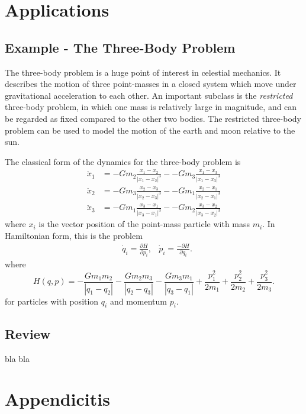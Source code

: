 \documentclass{report}
\theoremstyle{exampstyle} \newtheorem{example}[theorem]{Example}
\theoremstyle{exampstyle} \newtheorem{remark}[theorem]{Remark}
\theoremstyle{exampstyle} \newtheorem{definition}[theorem]{Definition}
\theoremstyle{exampstyle} \newtheorem{lemma}[theorem]{Lemma}
\theoremstyle{exampstyle} \newtheorem{proposition}[theorem]{Proposition}
\begin{document}
\section{Applications}

\subsection{Example - The Three-Body Problem}

The three-body problem \cite{musielak2014three} is a huge point of interest in celestial mechanics.
It describes the motion of three point-masses in a closed system which move under gravitational acceleration to each other.
An important subclass is the \textit{restricted} three-body problem, in which one mass is relatively large in magnitude, and can be regarded as fixed compared to the other two bodies.
The restricted three-body problem can be used to model the motion of the earth and moon relative to the sun.

The classical form of the dynamics for the three-body problem is
\begin{equation*}
	\begin{aligned}
		\ddot{x}_1 &= -G m_2 \frac{x_1 - x_2}{|x_1 - x_2|^3} - -G m_3 \frac{x_1 - x_3}{|x_1 - x_3|^3} \\
		\ddot{x}_2 &= -G m_3 \frac{x_2 - x_3}{|x_2 - x_3|^3} - -G m_1 \frac{x_2 - x_1}{|x_2 - x_1|^3} \\
		\ddot{x}_3 &= -G m_1 \frac{x_3 - x_1}{|x_3 - x_1|^3} - -G m_2 \frac{x_3 - x_2}{|x_3 - x_2|^3}
	\end{aligned}
\end{equation*} 
where $x_i$ is the vector position of the point-mass particle with mass $m_i$.
In Hamiltonian form, this is the problem
\begin{align*}
	&\dot{q}_i = \frac{\partial H}{\partial p_i}, &\dot{p}_i = \frac{- \partial H}{\partial q_i}.
\end{align*}
where
\begin{equation*}
	H(q,p) = - \frac{G m_1 m_2}{|q_1 - q_2|} - \frac{G m_2 m_3}{|q_2 - q_3|} - \frac{G m_3 m_1}{|q_3 - q_1|} + \frac{p_1^2}{2m_1} + \frac{p_2^2}{2m_2} + \frac{p_3^2}{2m_3}.
\end{equation*}
for particles with position $q_i$ and momentum $p_i$.


\subsection{Review}

bla bla


\section{Appendicitis}




\appendix
\end{document}
